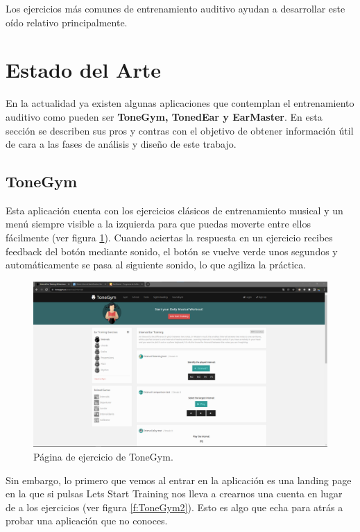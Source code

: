 \documentclass[12pt,twoside,titlepage]{report}
\begin{document}
Los ejercicios más comunes de entrenamiento auditivo ayudan a desarrollar este oído relativo principalmente.

\section{Estado del Arte}

En la actualidad ya existen algunas aplicaciones que contemplan el entrenamiento auditivo como pueden ser \textbf{ToneGym, TonedEar y EarMaster}. En esta sección se describen sus pros y contras con el objetivo de obtener información útil de cara a las fases de análisis y diseño de este trabajo.

\subsection{ToneGym}

Esta aplicación cuenta con los ejercicios clásicos de entrenamiento musical y un menú siempre visible a la izquierda para que puedas moverte entre ellos fácilmente (ver figura \ref{fig:ToneGym}). Cuando aciertas la respuesta en un ejercicio recibes feedback del botón mediante sonido, el botón se vuelve verde unos segundos y automáticamente se pasa al siguiente sonido, lo que agiliza la práctica.

\begin{figure}[H] 
    \includegraphics[scale=0.25]{Estado del Arte/tonegym}
    \centering
    \caption{Página de ejercicio de ToneGym.}
    \label{fig:ToneGym}
\end{figure}

Sin embargo, lo primero que vemos al entrar en la aplicación es una landing page en la que si pulsas Lets Start Training nos lleva a crearnos una cuenta en lugar de a los ejercicios (ver figura \ref{f:ToneGym2}). Esto es algo que echa para atrás a probar una aplicación que no conoces. 
\end{document}
